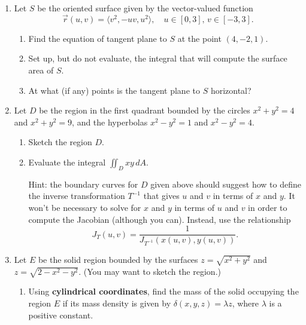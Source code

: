 \documentclass[12pt]{article}
\newcommand{\points}[1]{\marginpar{\hspace{24pt}[#1]}}
\newcommand{\di}{\displaystyle}
\begin{document}
\begin{enumerate}
\item Let $S$ be the oriented surface given by the vector-valued function
\[
\vec{r}(u,v) = \langle v^2,-uv,u^2\rangle,\quad u\in [0,3],\, v\in [-3,3].
\]
\begin{enumerate}
\item Find the equation of tangent plane to $S$ at the point $(4,-2,1)$.\points{6}

\vspace{3in}

\item Set up, but do not evaluate, the integral that will compute the surface area of $S$. \points{4}

\vspace{3in}

\item At what (if any) points is the tangent plane to $S$ horizontal? \points{2}
\end{enumerate}

\newpage

\item Let $D$ be the region in the first quadrant bounded by the circles $x^2+y^2=4$ and $x^2+y^2=9$, and the hyperbolas $x^2-y^2=1$ and $x^2-y^2=4$.
\begin{enumerate}
\item Sketch the region $D$. \points{3}

\vspace{1.5in}

\item Evaluate the integral $\di \iint_D xy \, dA.$ \points{7}

\noindent Hint: the boundary curves for $D$ given above should suggest how to define the inverse transformation $T^{-1}$ that gives $u$ and $v$ in terms of $x$ and $y$. It won't be necessary to solve for $x$ and $y$ in terms of $u$ and $v$ in order to compute the Jacobian (although you can). Instead, use the relationship
\[
J_{T}(u,v) = \frac{1}{J_{T^{-1}}(x(u,v),y(u,v))}.
\]

\end{enumerate}
\newpage

\item Let $E$ be the solid region bounded by the surfaces $z=\sqrt{x^2+y^2}$ and $z=\sqrt{2-x^2-y^2}$. (You may want to sketch the region.)
\begin{enumerate}
\item Using {\bf cylindrical coordinates}, find the mass of the solid occupying the region $E$ if its mass density is given by $\delta(x,y,z) = \lambda z$, where $\lambda$ is a positive constant.\points{7}


\end{enumerate}
\end{enumerate}
\end{document}
